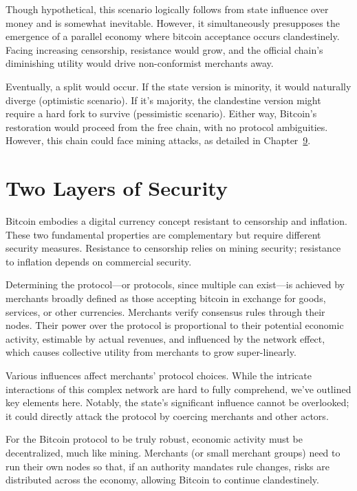 \documentclass[
  a5paper,
  smalldemyvopaper,10pt,twoside,onecolumn,openright,extrafontsizes,hidelinks]{memoir}
\begin{document}
Though hypothetical, this scenario logically follows from state
influence over money and is somewhat inevitable. However, it
simultaneously presupposes the emergence of a parallel economy where
bitcoin acceptance occurs clandestinely. Facing increasing censorship,
resistance would grow, and the official chain's diminishing utility
would drive non-conformist merchants away.

Eventually, a split would occur. If the state version is minority, it
would naturally diverge (optimistic scenario). If it's majority, the
clandestine version might require a hard fork to survive (pessimistic
scenario). Either way, Bitcoin's restoration would proceed from the free
chain, with no protocol ambiguities. However, this chain could face
mining attacks, as detailed in Chapter~\hyperref[ch:censure]{9}.

\section*{Two Layers of Security}\label{two-layers-of-security}


Bitcoin embodies a digital currency concept resistant to censorship and
inflation. These two fundamental properties are complementary but
require different security measures. Resistance to censorship relies on
mining security; resistance to inflation depends on commercial security.

Determining the protocol---or protocols, since multiple can exist---is
achieved by merchants broadly defined as those accepting bitcoin in
exchange for goods, services, or other currencies. Merchants verify
consensus rules through their nodes. Their power over the protocol is
proportional to their potential economic activity, estimable by actual
revenues, and influenced by the network effect, which causes collective
utility from merchants to grow super-linearly.

Various influences affect merchants' protocol choices. While the
intricate interactions of this complex network are hard to fully
comprehend, we've outlined key elements here. Notably, the state's
significant influence cannot be overlooked; it could directly attack the
protocol by coercing merchants and other actors.

For the Bitcoin protocol to be truly robust, economic activity must be
decentralized, much like mining. Merchants (or small merchant groups)
need to run their own nodes so that, if an authority mandates rule
changes, risks are distributed across the economy, allowing Bitcoin to
continue clandestinely.
\end{document}
